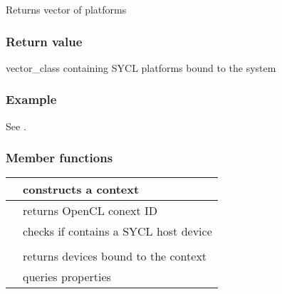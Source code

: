 \documentclass[letterpaper,10pt,english]{sphinxmanual}
\begin{document}
Returns vector of platforms
\subsubsection*{Return value}

vector\_class containing SYCL platforms bound to the system
\subsubsection*{Example}

See {\hyperref[\detokenize{programming-interface/runtime/platform:platform-example}]{}}.


\subsubsection{}
\label{\detokenize{programming-interface/runtime/context:context}}\label{\detokenize{programming-interface/runtime/context::doc}}
\begin{sphinxVerbatim}[commandchars=\\\{\}]
 
\end{sphinxVerbatim}
\subsubsection*{Member functions}


\begin{savenotes}\sphinxattablestart
\centering
\begin{tabulary}{\linewidth}[t]{|T|T|}
\hline

{\hyperref[\detokenize{programming-interface/runtime/context:constructor}]{}}
&
constructs a context
\\
\hline
{\hyperref[\detokenize{programming-interface/runtime/context:get}]{}}
&
returns OpenCL conext ID
\\
\hline
{\hyperref[\detokenize{programming-interface/runtime/context:is-host}]{}}
&
checks if contains a SYCL host device
\\
\hline
{\hyperref[\detokenize{programming-interface/runtime/context:get-platform}]{}}
&\\
\hline
{\hyperref[\detokenize{programming-interface/runtime/context:get-devices}]{}}
&
returns devices bound to the context
\\
\hline
{\hyperref[\detokenize{programming-interface/runtime/context:get-info}]{}}
&
queries properties
\\
\hline
\end{tabulary}
\par
\sphinxattableend\end{savenotes}
\end{document}
